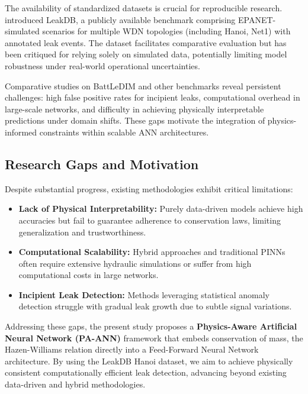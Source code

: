 \documentclass[final,5p,times,twocolumn,authoryear]{elsarticle}
\begin{document}
The availability of standardized datasets is crucial for reproducible research. \cite{kyriakou2018leakdb} introduced LeakDB, a publicly available benchmark comprising EPANET-simulated scenarios for multiple WDN topologies (including Hanoi, Net1) with annotated leak events. The dataset facilitates comparative evaluation but has been critiqued for relying solely on simulated data, potentially limiting model robustness under real-world operational uncertainties.

Comparative studies on BattLeDIM \cite{barros_leak_2025} and other benchmarks reveal persistent challenges: high false positive rates for incipient leaks, computational overhead in large-scale networks, and difficulty in achieving physically interpretable predictions under domain shifts. These gaps motivate the integration of physics-informed constraints within scalable ANN architectures.

\subsection{Research Gaps and Motivation}

Despite substantial progress, existing methodologies exhibit critical limitations:

\begin{itemize}
    \item \textbf{Lack of Physical Interpretability:} Purely data-driven models \cite{MAHDI2024100685, punukollu2023leakdetection} achieve high accuracies but fail to guarantee adherence to conservation laws, limiting generalization and trustworthiness.
    \item \textbf{Computational Scalability:} Hybrid approaches \cite{mazaev2022probabilisticleaklocalization} and traditional PINNs \cite{lin2025digitaltwin} often require extensive hydraulic simulations or suffer from high computational costs in large networks.
    \item \textbf{Incipient Leak Detection:} Methods leveraging statistical anomaly detection \cite{barros_leak_2025, TORNYEVIADZI2023106062} struggle with gradual leak growth due to subtle signal variations.
\end{itemize}

Addressing these gaps, the present study proposes a \textbf{Physics-Aware Artificial Neural Network (PA-ANN)} framework that embeds conservation of mass, the Hazen-Williams relation directly into a Feed-Forward Neural Network architecture. By using the LeakDB Hanoi dataset, we aim to achieve physically consistent computationally efficient leak detection, advancing beyond existing data-driven and hybrid methodologies.
\end{document}
